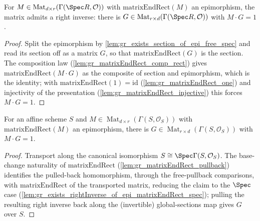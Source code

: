 \begin{lemma}
  \label{lem:gr_exists_rightInverse_of_epi_matrixEndRect_spec}
  For \(M \in \operatorname{Mat}_{d\times r}(\Gamma(\Spec R, \mathcal{O}))\) with
  \(\mathrm{matrixEndRect}(M)\) an epimorphism, the matrix admits a right inverse: there is
  \(G \in \operatorname{Mat}_{r\times d}(\Gamma(\Spec R, \mathcal{O}))\) with \(M \cdot G = 1\).
\end{lemma}
\begin{proof}
  Split the epimorphism by \cref{lem:gr_exists_section_of_epi_free_spec} and read its section
  off as a matrix \(G\), so that \(\mathrm{matrixEndRect}(G)\) is the section. The composition
  law (\cref{lem:gr_matrixEndRect_comp_rect}) gives \(\mathrm{matrixEndRect}(M\cdot G)\) as the
  composite of section and epimorphism, which is the identity; with
  \(\mathrm{matrixEndRect}(1) = \mathrm{id}\) (\cref{lem:gr_matrixEndRect_one}) and injectivity
  of the presentation (\cref{lem:gr_matrixEndRect_injective}) this forces \(M \cdot G = 1\).
\end{proof}

\begin{lemma}
  \label{lem:gr_exists_rightInverse_of_epi_matrixEndRect}
  For an affine scheme \(S\) and
  \(M \in \operatorname{Mat}_{d\times r}(\Gamma(S, \mathcal{O}_S))\) with
  \(\mathrm{matrixEndRect}(M)\) an epimorphism, there is
  \(G \in \operatorname{Mat}_{r\times d}(\Gamma(S, \mathcal{O}_S))\) with \(M \cdot G = 1\).
\end{lemma}
\begin{proof}
  Transport along the canonical isomorphism \(S \cong \Spec\Gamma(S, \mathcal{O}_S)\). The
  base-change naturality of \(\mathrm{matrixEndRect}\) (\cref{lem:gr_matrixEndRect_pullback})
  identifies the pulled-back homomorphism, through the free-pullback comparisons, with
  \(\mathrm{matrixEndRect}\) of the transported matrix, reducing the claim to the \(\Spec\)
  case (\cref{lem:gr_exists_rightInverse_of_epi_matrixEndRect_spec}); pulling the resulting
  right inverse back along the (invertible) global-sections map gives \(G\) over \(S\).
\end{proof}

